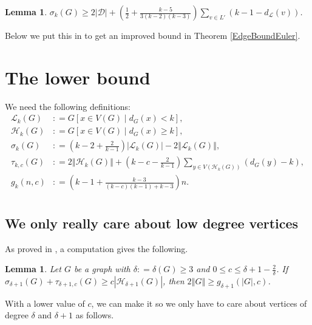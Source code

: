 \documentclass[12pt]{article}
\theoremstyle{plain}
\newtheorem{lem}[thm]{Lemma}
\theoremstyle{definition}
\theoremstyle{remark}
\newcommand{\fancy}[1]{\mathcal{#1}}
\newcommand{\D}{\fancy{D}}
\renewcommand{\L}{\fancy{L}}
\newcommand{\HH}{\fancy{H}}
\newcommand{\card}[1]{\left|#1\right|}
\newcommand{\size}[1]{\left\Vert#1\right\Vert}
\newcommand{\parens}[1]{\left( #1 \right)}
\newcommand{\brackets}[1]{\left[ #1 \right]}
\newcommand{\DefinedAs}{\mathrel{\mathop:}=}
\def\D{\fancy{D}}
\begin{document}
\begin{lem}\label{ImprovedSigmaBound}
	$\sigma_k(G) \ge 2|\D| + \parens{\frac12 + \frac{k-5}{3(k-2)(k-3)}}\sum_{v \in L'} (k-1-d_{\L}(v))$.
\end{lem}

Below we put this in to get an improved bound in Theorem \ref{EdgeBoundEuler}.

\section{The lower bound}
We need the following definitions:
\begin{align*}
\L_k(G) &\DefinedAs G\brackets{x \in V(G) \mid d_G(x) < k},\\
\HH_k(G) &\DefinedAs G\brackets{x \in V(G) \mid d_G(x) \ge k},\\
\sigma_k(G) &\DefinedAs \parens{k-2 + \frac{2}{k-1}}\card{\L_k(G)} - 2\size{\L_k(G)},\\
\tau_{k,c}(G) &\DefinedAs 2\size{\HH_k(G)} + \parens{k-c - \frac{2}{k-1}}\sum_{y \in V(\HH_k(G))} \parens{d_G(y) - k},\\
g_k(n, c) &\DefinedAs \parens{k-1 + \frac{k-3}{(k-c)(k-1) + k-3}}n.\\
\end{align*}

\subsection{We only really care about low degree vertices}

\noindent As proved in \cite{kostochkastiebitzedgesincriticalgraph}, a computation gives the following.
\begin{lem}\label{SigmaTauBoundEuler}
Let $G$ be a graph with $\delta \DefinedAs \delta(G) \ge 3$ and $0 \leq c \leq \delta + 1 - \frac{2}{\delta}$.  If $\sigma_{\delta + 1}(G) + \tau_{\delta + 1, c}(G) \ge c\card{\HH_{\delta + 1}(G)}$, then $2\size{G} \ge g_{\delta + 1}(\card{G}, c)$.
\end{lem}

With a lower value of $c$, we can make it so we only have to care about vertices of degree $\delta$ and $\delta + 1$ as follows.
\end{document}
